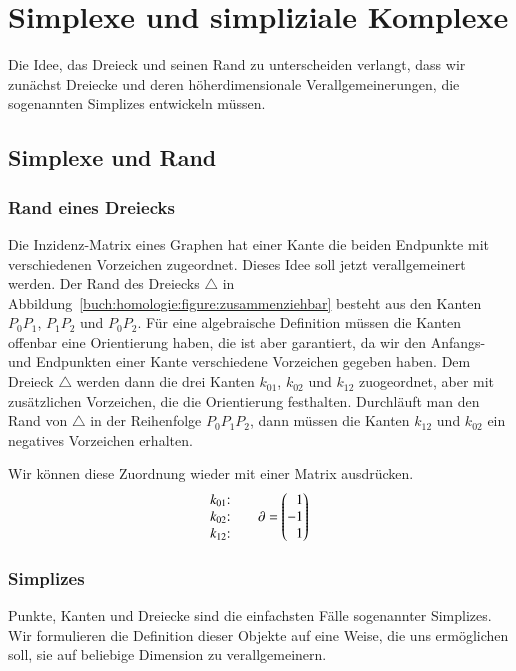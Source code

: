 %
%
%
\section{Simplexe und simpliziale Komplexe
\label{buch:section:simplexe}}
Die Idee, das Dreieck und seinen Rand zu unterscheiden verlangt,
dass wir zunächst Dreiecke und deren höherdimensionale Verallgemeinerungen,
die sogenannten Simplizes entwickeln müssen.

\subsection{Simplexe und Rand
\label{buch:subsection:simplexe}}

\subsubsection{Rand eines Dreiecks}
Die Inzidenz-Matrix eines Graphen hat einer Kante die beiden Endpunkte
mit verschiedenen Vorzeichen zugeordnet.
Dieses Idee soll jetzt verallgemeinert werden.
Der Rand des Dreiecks $\triangle$ in
Abbildung~\ref{buch:homologie:figure:zusammenziehbar}
besteht aus den Kanten $P_0P_1$, $P_1P_2$ und $P_0P_2$.
Für eine algebraische Definition müssen die Kanten offenbar eine
Orientierung haben, die ist aber garantiert, da wir den Anfangs-
und Endpunkten einer Kante verschiedene Vorzeichen gegeben haben.
Dem Dreieck $\triangle$ werden dann die drei Kanten $k_{01}$, $k_{02}$
und $k_{12}$ zuogeordnet, aber mit zusätzlichen Vorzeichen, die
die Orientierung festhalten.
Durchläuft man den Rand von $\triangle$ in der Reihenfolge $P_0P_1P_2$,
dann müssen die Kanten $k_{12}$ und $k_{02}$ ein negatives Vorzeichen
erhalten.

Wir können diese Zuordnung wieder mit einer Matrix ausdrücken.
\[
\begin{matrix}
\text{$k_{01}$:}\mathstrut\\
\text{$k_{02}$:}\mathstrut\\
\text{$k_{12}$:}\mathstrut
\end{matrix}
\qquad
\partial
=
\begin{pmatrix*}[r]
1\mathstrut\\
-1\mathstrut\\
1\mathstrut
\end{pmatrix*}
\]

\subsubsection{Simplizes}
Punkte, Kanten und Dreiecke sind die einfachsten Fälle sogenannter
Simplizes.
Wir formulieren die Definition dieser Objekte auf eine Weise,
die uns ermöglichen soll, sie auf beliebige Dimension zu verallgemeinern.


